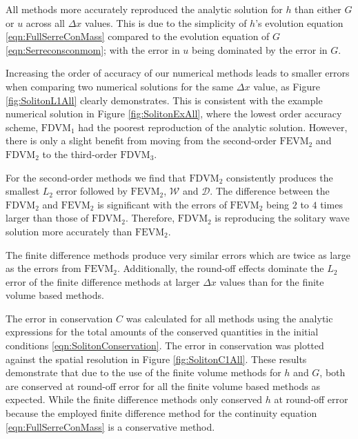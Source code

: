 All methods more accurately reproduced the analytic solution for $h$ than either $G$ or $u$ across all $\Delta x$ values. This is due to the simplicity of $h$'s evolution equation \eqref{eqn:FullSerreConMass} compared to the evolution equation of $G$ \eqref{eqn:Serreconsconmom}; with the error in $u$ being dominated by the error in $G$. 

Increasing the order of accuracy of our numerical methods leads to smaller errors when comparing two numerical solutions for the same $\Delta x$ value, as Figure \ref{fig:SolitonL1All} clearly demonstrates. This is consistent with the example numerical solution in Figure \ref{fig:SolitonExAll}, where the lowest order accuracy scheme, $\text{FDVM}_1$ had the poorest reproduction of the analytic solution. However, there is only a slight benefit from moving from the second-order $\text{FEVM}_2$ and $\text{FDVM}_2$ to the third-order $\text{FDVM}_3$.

For the second-order methods we find that $\text{FDVM}_2$ consistently produces the smallest $L_2$ error followed by $\text{FEVM}_2$, $\mathcal{W}$ and $\mathcal{D}$. The difference between the $\text{FDVM}_2$ and $\text{FEVM}_2$ is significant with the errors of $\text{FEVM}_2$ being $2$ to $4$ times larger than those of $\text{FDVM}_2$. Therefore, $\text{FDVM}_2$ is reproducing the solitary wave solution more accurately than $\text{FEVM}_2$.

The finite difference methods produce very similar errors which are twice as large as the errors from $\text{FEVM}_2$. Additionally, the round-off effects dominate the $L_2$ error of the finite difference methods at larger $\Delta x$ values than for the finite volume based methods.

The error in conservation $C$ was calculated for all methods using the analytic expressions for the total amounts of the conserved quantities in the initial conditions \eqref{eqn:SolitonConservation}. The error in conservation was plotted against the spatial resolution in Figure \ref{fig:SolitonC1All}. These results demonstrate that due to the use of the finite volume methods for $h$ and $G$, both are conserved at round-off error for all the finite volume based methods as expected. While the finite difference methods only conserved $h$ at round-off error because the employed finite difference method for the continuity equation \eqref{eqn:FullSerreConMass} is a conservative method. 

